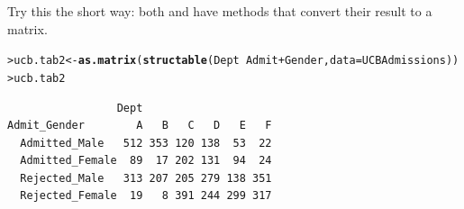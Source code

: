 \documentclass[10pt]{report}\usepackage[]{graphicx}\usepackage[]{color}
\makeatletter
\newcommand{\hlopt}[1]{\textcolor[rgb]{0,0,0}{#1}}%
\newcommand{\hlstd}[1]{\textcolor[rgb]{0.345,0.345,0.345}{#1}}%
\newcommand{\hlkwb}[1]{\textcolor[rgb]{0.69,0.353,0.396}{#1}}%
\newcommand{\hlkwc}[1]{\textcolor[rgb]{0.333,0.667,0.333}{#1}}%
\newcommand{\hlkwd}[1]{\textcolor[rgb]{0.737,0.353,0.396}{\textbf{#1}}}%
\newenvironment{kframe}{%
 \def\at@end@of@kframe{}%
 \ifinner\ifhmode%
  \def\at@end@of@kframe{\end{minipage}}%
  \begin{minipage}{\columnwidth}%
 \fi\fi%
 \def\FrameCommand##1{\hskip\@totalleftmargin \hskip-\fboxsep
 \colorbox{shadecolor}{##1}\hskip-\fboxsep
     \hskip-\linewidth \hskip-\@totalleftmargin \hskip\columnwidth}%
 \MakeFramed {\advance\hsize-\width
   \@totalleftmargin\z@ \linewidth\hsize
   \@setminipage}}%
 {\par\unskip\endMakeFramed%
 \at@end@of@kframe}
\newenvironment{knitrout}{}{} %
\renewenvironment{knitrout}{\small\renewcommand{\baselinestretch}{.85}}{} %
\makeatother
\begin{document}
\begin{Exercises}
\begin{enumerate*}
    \item Try this the short way:  both  and  have 
    methods that convert their result to a matrix.
    \begin{ans}
\begin{knitrout}\footnotesize
{}\color{fgcolor}\begin{kframe}
\begin{alltt}
\hlstd{> }\hlstd{ucb.tab2} \hlkwb{<-} \hlkwd{as.matrix}\hlstd{(}\hlkwd{structable}\hlstd{(Dept} \hlopt{~} \hlstd{Admit} \hlopt{+} \hlstd{Gender,} \hlkwc{data} \hlstd{= UCBAdmissions))}
\hlstd{> }\hlstd{ucb.tab2}
\end{alltt}
\begin{verbatim}
                 Dept
Admit_Gender        A   B   C   D   E   F
  Admitted_Male   512 353 120 138  53  22
  Admitted_Female  89  17 202 131  94  24
  Rejected_Male   313 207 205 279 138 351
  Rejected_Female  19   8 391 244 299 317
\end{verbatim}
\end{kframe}
\end{knitrout}
    \end{ans}
    
  \end{enumerate*}


\end{Exercises}
\end{document}
